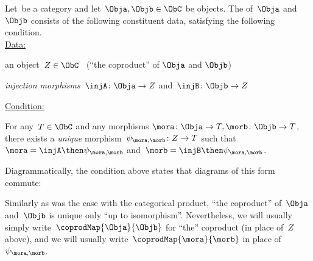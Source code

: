 \begin{ctdefinition}[Coproduct]
  \label{def:catcoproduct}
  Let~\CatC be a category and let~$\Obja, \Objb \in \ObC$ be objects. The \emph{} of~$\Obja$ and~$\Objb$ consists of the following constituent data, satisfying the following condition. \\
  \underline{Data:}
  \begin{compactenum}
    \item an object~$Z \in \ObC$ \ (``the coproduct'' of $\Obja$ and $\Objb$)
    \item \emph{injection morphisms}~$\injA \colon \Obja \to Z $ and~$\injB \colon \Objb \to Z$
  \end{compactenum}
  \underline{Condition:}
  \begin{compactenum}
    \item For any~$T \in \ObC$ and any morphisms $\mora \colon  \Obja \to T, \morb \colon \Objb \to T$, there exists a \emph{unique} morphism~$\psi_{\mora, \morb} \colon Z \to T$ such that~$\mora = \injA\then \psi_{\mora, \morb}$ and~$\morb = \injB \then \psi_{\mora,\morb}$.
  \end{compactenum}
\end{ctdefinition}


\begin{remark}
  Diagrammatically, the condition above states that diagrams of this form commute:
  \begin{center}
  \end{center}
\end{remark}

\begin{remark}
  Similarly as was the case with the categorical product, ``the coproduct'' of~$\Obja$ and~$\Objb$ is unique only ``up to isomorphism''. Nevertheless, we will usually simply write~$\coprodMap{\Obja}{\Objb}$ for ``the'' coproduct (in place of~$Z$ above), and we will usually write~$\coprodMap{\mora}{\morb}$ in place of~$\psi_{\mora, \morb}$.
\end{remark}

%
%


%

